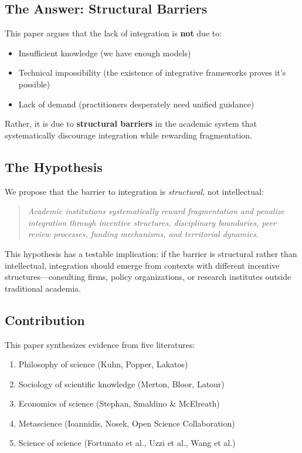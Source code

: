 \documentclass[12pt,a4paper]{article}
\begin{document}
\subsection{The Answer: Structural Barriers}

This paper argues that the lack of integration is \textbf{not} due to:
\begin{itemize}
\item Insufficient knowledge (we have enough models)
\item Technical impossibility (the existence of integrative frameworks proves it's possible)
\item Lack of demand (practitioners desperately need unified guidance)
\end{itemize}

Rather, it is due to \textbf{structural barriers} in the academic system that systematically discourage integration while rewarding fragmentation.

\subsection{The Hypothesis}

We propose that the barrier to integration is \textit{structural}, not intellectual:

\begin{quote}
\textit{Academic institutions systematically reward fragmentation and penalize integration through incentive structures, disciplinary boundaries, peer review processes, funding mechanisms, and territorial dynamics.}
\end{quote}

This hypothesis has a testable implication: if the barrier is structural rather than intellectual, integration should emerge from contexts with different incentive structures---consulting firms, policy organizations, or research institutes outside traditional academia.

\subsection{Contribution}

This paper synthesizes evidence from five literatures:
\begin{enumerate}[nosep]
\item Philosophy of science (Kuhn, Popper, Lakatos)
\item Sociology of scientific knowledge (Merton, Bloor, Latour)
\item Economics of science (Stephan, Smaldino \& McElreath)
\item Metascience (Ioannidis, Nosek, Open Science Collaboration)
\item Science of science (Fortunato et al., Uzzi et al., Wang et al.)
\end{enumerate}
\end{document}
